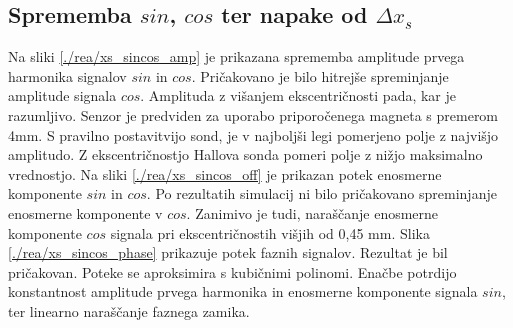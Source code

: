 \subsection{Sprememba $sin$, $cos$ ter napake od $\Delta x_s$}
Na sliki \ref{./rea/xs_sincos_amp} je prikazana sprememba amplitude prvega harmonika signalov $sin$ in $cos$. Pričakovano je bilo hitrejše spreminjanje amplitude signala $cos$. Amplituda z višanjem ekscentričnosti pada, kar je razumljivo. Senzor je predviden za uporabo priporočenega magneta s premerom 4mm. S pravilno postavitvijo sond, je v najboljši legi pomerjeno polje z najvišjo amplitudo. Z ekscentričnostjo Hallova sonda pomeri polje z nižjo maksimalno vrednostjo. Na sliki \ref{./rea/xs_sincos_off} je prikazan potek enosmerne komponente $sin$ in $cos$. Po rezultatih simulacij ni bilo pričakovano spreminjanje enosmerne komponente v $cos$. Zanimivo je tudi, naraščanje enosmerne komponente $cos$ signala pri ekscentričnostih višjih od 0,45 mm. Slika \ref{./rea/xs_sincos_phase} prikazuje potek faznih signalov. Rezultat je bil pričakovan.%
Poteke se aproksimira s kubičnimi polinomi. Enačbe potrdijo konstantnost amplitude prvega harmonika in enosmerne komponente signala $sin$, ter linearno naraščanje faznega zamika.

